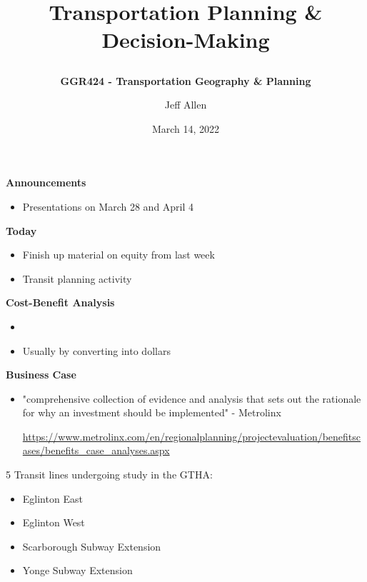 \documentclass[aspectratio=169]{beamer}
\title{\textbf{Transportation Planning \& Decision-Making}
\subtitle{\textbf{GGR424 - Transportation Geography \& Planning}}
\author{Jeff Allen}
\institute{University of Toronto}
\date{March 14, 2022}}
\begin{document}
	
\begin{frame}
	\titlepage	
\end{frame}





\begin{frame}
	
	\textbf{Announcements}
	
	\begin{itemize}
		\item Presentations on March 28 and April 4
	\end{itemize}
	
	
	\textbf{Today}
	
	\begin{itemize}
		\item Finish up material on equity from last week
		\item Transit planning activity
		
	\end{itemize}
\end{frame}




\begin{frame}
	
	\textbf{Cost-Benefit Analysis}
	
	\begin{itemize}
		\item 
		\item Usually by converting into dollars
	\end{itemize}
	
	
	
	\textbf{Business Case}
	
	\begin{itemize}
		\item "comprehensive
		collection of evidence and analysis
		that sets out the rationale for why an
		investment should be implemented" - Metrolinx
		
		\tiny\url{https://www.metrolinx.com/en/regionalplanning/projectevaluation/benefitscases/benefits_case_analyses.aspx}
	\end{itemize}
	
	
	
\end{frame}




\begin{frame}
	
	5 Transit lines undergoing study in the GTHA:
	
	\begin{itemize}
		\item Eglinton East
		\item Eglinton West
		\item Scarborough Subway Extension
		\item Yonge Subway Extension
		
	\end{itemize}
	
\end{frame}
\end{document}
